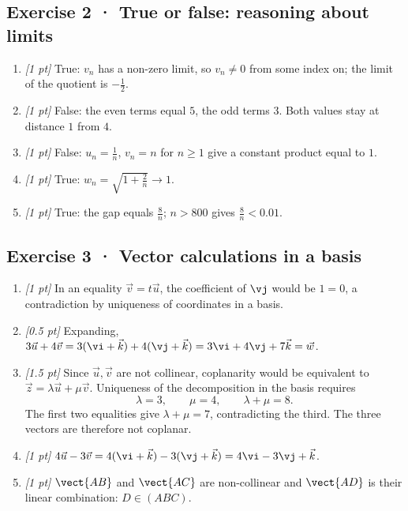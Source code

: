 \subsection*{Exercise 2 · True or false: reasoning about limits}\begin{enumerate}

\item \textit{[1 pt]} True: $v_n$ has a non-zero limit, so $v_n\ne0$ from some index on; the limit of the quotient is $-\frac{1}{2}$.

\item \textit{[1 pt]} False: the even terms equal $5$, the odd terms $3$. Both values stay at distance $1$ from $4$.

\item \textit{[1 pt]} False: $u_n=\frac{1}{n}$, $v_n=n$ for $n\ge1$ give a constant product equal to $1$.

\item \textit{[1 pt]} True: $w_n=\sqrt{1+\frac{2}{n}}\to1$.

\item \textit{[1 pt]} True: the gap equals $\frac{8}{n}$; $n>800$ gives $\frac{8}{n}<\num{0,01}$.

\end{enumerate}

\subsection*{Exercise 3 · Vector calculations in a basis}\begin{enumerate}

\item \textit{[1 pt]} In an equality $\vec v=t\vec u$, the coefficient of $\vj $ would be $1=0$, a contradiction by uniqueness of coordinates in a basis.

\item \textit{[0.5 pt]} Expanding, $3\vec u+4\vec v=3(\vi +\vec k)+4(\vj +\vec k)=3\vi +4\vj +7\vec k=\vec w$.

\item \textit{[1.5 pt]} Since $\vec u,\vec v$ are not collinear, coplanarity would be equivalent to $\vec z=\lambda\vec u+\mu\vec v$. Uniqueness of the decomposition in the basis requires
\[\lambda=3,\qquad\mu=4,\qquad\lambda+\mu=8.\]
The first two equalities give $\lambda+\mu=7$, contradicting the third. The three vectors are therefore not coplanar.

\item \textit{[1 pt]} $4\vec u-3\vec v=4(\vi +\vec k)-3(\vj +\vec k)=4\vi -3\vj +\vec k$.

\item \textit{[1 pt]} $\vect{AB}$ and $\vect{AC}$ are non-collinear and $\vect{AD}$ is their linear combination: $D\in(ABC)$.

\end{enumerate}

